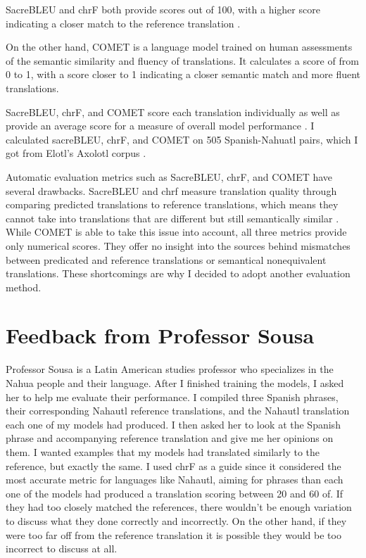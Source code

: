 \documentclass[10pt,twocolumn]{article}
\begin{document}
SacreBLEU and chrF both provide scores out of 100, with a higher score indicating a closer match to the reference translation \cite{ChrF} \cite{BLEUGoogle}. 

On the other hand, COMET is a language model trained on human assessments of the semantic similarity and fluency of translations. It calculates a score of from 0 to 1, with a score closer to 1 indicating a closer semantic match and more fluent translations.


SacreBLEU, chrF, and COMET score each translation individually as well as provide an average score for a measure of overall model performance \cite{COMETHF}. I calculated sacreBLEU, chrF, and COMET on 505 Spanish-Nahuatl pairs, which I got from Elotl's Axolotl corpus \cite{Elotl}. 


Automatic evaluation metrics such as SacreBLEU, chrF, and COMET have several drawbacks. SacreBLEU and chrf measure translation quality through comparing predicted translations to reference translations, which means they cannot take into translations that are different but still semantically similar \cite{BLEUCritique}. While COMET is able to take this issue into account, all three metrics provide only numerical scores. They offer no insight into the sources behind mismatches between predicated and reference translations or semantical nonequivalent translations. These shortcomings are why I decided to adopt another evaluation method. 


\section{Feedback from Professor Sousa}
Professor Sousa is a Latin American studies professor who specializes in the Nahua people and their language. After I finished training the models, I asked her to help me evaluate their performance. I compiled three Spanish phrases, their corresponding Nahautl reference translations, and the Nahautl translation each one of my models had produced. I then asked her to look at the Spanish phrase and accompanying reference translation and give me her opinions on them. I wanted examples that my models had translated similarly to the reference, but exactly the same. I used chrF as a guide since it considered the most accurate metric for languages like Nahautl, aiming for phrases than each one of the models had produced a translation scoring between 20 and 60 of. If they had too closely matched the references, there wouldn't be enough variation to discuss what they done correctly and incorrectly. On the other hand, if they were too far off from the reference translation it is possible they would be too incorrect to discuss at all. 
\end{document}
